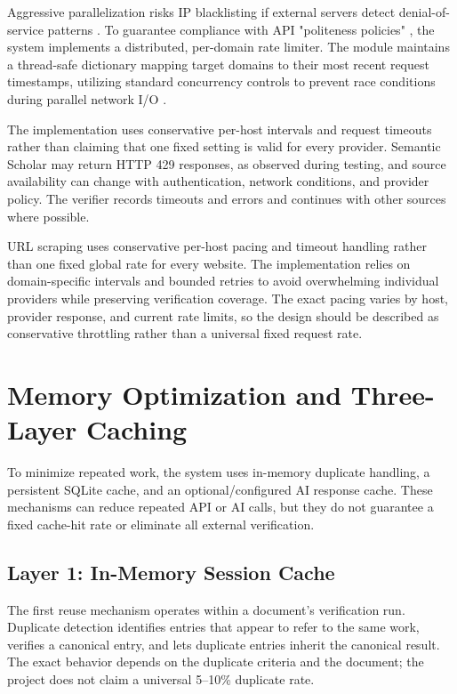 \documentclass[12pt,a4paper,oneside]{report}
\begin{document}
Aggressive parallelization risks IP blacklisting if external servers detect denial-of-service patterns \cite{owasp2025}. To guarantee compliance with API "politeness policies" \cite{mitchell2018}, the system implements a distributed, per-domain rate limiter. The module maintains a thread-safe dictionary mapping target domains to their most recent request timestamps, utilizing standard concurrency controls to prevent race conditions during parallel network I/O \cite{tanenbaum2023}. 

The implementation uses conservative per-host intervals and request timeouts rather than claiming that one fixed setting is valid for every provider. Semantic Scholar may return HTTP 429 responses, as observed during testing, and source availability can change with authentication, network conditions, and provider policy. The verifier records timeouts and errors and continues with other sources where possible.

URL scraping uses conservative per-host pacing and timeout handling rather than one fixed global rate for every website. The implementation relies on domain-specific intervals and bounded retries to avoid overwhelming individual providers while preserving verification coverage. The exact pacing varies by host, provider response, and current rate limits, so the design should be described as conservative throttling rather than a universal fixed request rate.

\section{Memory Optimization and Three-Layer Caching}

To minimize repeated work, the system uses in-memory duplicate handling, a persistent SQLite cache, and an optional/configured AI response cache. These mechanisms can reduce repeated API or AI calls, but they do not guarantee a fixed cache-hit rate or eliminate all external verification.

\subsection{Layer 1: In-Memory Session Cache}
The first reuse mechanism operates within a document's verification run. Duplicate detection identifies entries that appear to refer to the same work, verifies a canonical entry, and lets duplicate entries inherit the canonical result. The exact behavior depends on the duplicate criteria and the document; the project does not claim a universal 5--10\% duplicate rate.
\end{document}
